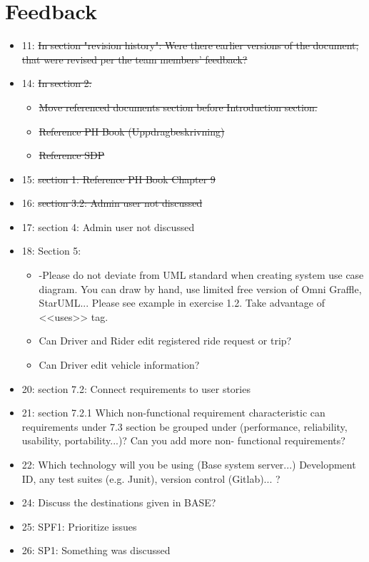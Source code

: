 \documentclass{article}
\begin{document}
\section*{Feedback}
\begin{itemize}
    \item 11: \sout{In section "revision history": Were there earlier versions of the document, that were revised per the team members' feedback?}
    \item 14: \sout{In section 2:}
    \begin{itemize}
        \item \sout{Move referenced documents section before Introduction section.}
        \item \sout{Reference PH Book (Uppdragbeskrivning)}
        \item \sout{Reference SDP}
    \end{itemize}
    \item 15: \sout{section 1: Reference PH Book Chapter 9}
    \item 16: \sout{section 3.2: Admin user not discussed}
    \item 17: section 4: Admin user not discussed
    \item 18: Section 5:
    \begin{itemize}
        \item -Please do not deviate from UML standard when creating system use case diagram. You can draw by hand, use limited free version of Omni Graffle, StarUML... Please see example in exercise 1.2. Take advantage of <<uses>> tag.
        \item Can Driver and Rider edit registered ride request or trip?
        \item Can Driver edit vehicle information?
    \end{itemize}
    \item 20: section 7.2: Connect requirements to user stories
    \item 21: section 7.2.1 Which non-functional requirement characteristic can requirements under 7.3 section be grouped under (performance, reliability, usability, portability...)? Can you add more non- functional requirements?
    \item 22: Which technology will you be using (Base system server...) Development ID, any test suites (e.g. Junit), version control (Gitlab)... ?
    \item 24: Discuss the destinations given in BASE?
    \item 25: SPF1: Prioritize issues
    \item 26: SP1: Something was discussed
\end{itemize}
\end{document}
